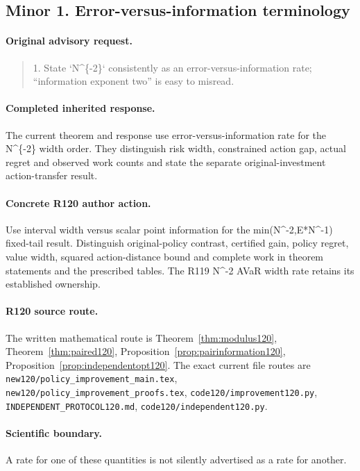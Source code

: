 \subsection{Minor 1. Error-versus-information terminology}
\label{response120:minor-1}
\paragraph{Original advisory request.}
\begin{quote}
1. State `N\textasciicircum{}\{-2\}` consistently as an error-versus-information rate; “information exponent two” is easy to misread.
\end{quote}
\paragraph{Completed inherited response.}
The current theorem and response use error-versus-information rate for the N\textasciicircum{}\{-2\} width order. They distinguish risk width, constrained action gap, actual regret and observed work counts and state the separate original-investment action-transfer result.
\paragraph{Concrete R120 author action.}
Use interval width versus scalar point information for the min(N\textasciicircum{}-2,E*N\textasciicircum{}-1) fixed-tail result. Distinguish original-policy contrast, certified gain, policy regret, value width, squared action-distance bound and complete work in theorem statements and the prescribed tables. The R119 N\textasciicircum{}-2 AVaR width rate retains its established ownership.
\paragraph{R120 source route.}
The written mathematical route is Theorem~\ref{thm:modulus120}, Theorem~\ref{thm:paired120}, Proposition~\ref{prop:pairinformation120}, Proposition~\ref{prop:independentopt120}. The exact current file routes are \nolinkurl{new120/policy_improvement_main.tex}, \nolinkurl{new120/policy_improvement_proofs.tex}, \nolinkurl{code120/improvement120.py}, \nolinkurl{INDEPENDENT_PROTOCOL120.md}, \nolinkurl{code120/independent120.py}.
\paragraph{Scientific boundary.}
A rate for one of these quantities is not silently advertised as a rate for another.

